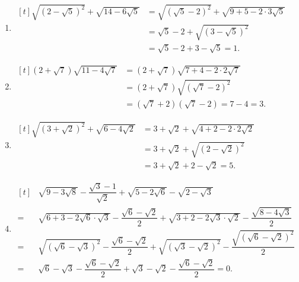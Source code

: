 \begin{bt}
{\begin{enumerate}
			\item $\begin{aligned}[t]
			\sqrt{\left(2-\sqrt{5}\right)^2}+\sqrt{14-6\sqrt{5}} &=\sqrt{\left(\sqrt{5} -2\right)^2} +\sqrt{9+5-2\cdot 3\sqrt{5}} \\
			&=\sqrt{5}-2 +\sqrt{\left(3-\sqrt{5}\right)^2} \\
			&=\sqrt{5}-2 +3-\sqrt{5}=1.
			\end{aligned}$
			\item $\begin{aligned}[t]
			\left(2+\sqrt{7}\right)\sqrt{11-4\sqrt{7}} &=(2+\sqrt{7}) \sqrt{7+4 -2\cdot 2\sqrt{7}} \\
			&=\left(2+\sqrt{7}\right)\sqrt{\left(\sqrt{7}-2\right)^2} \\
			&=\left(\sqrt{7}+2\right)\left(\sqrt{7}-2\right)=7-4=3.
			\end{aligned}$
			\item $\begin{aligned}[t]
			\sqrt{\left(3+\sqrt{2}\right)^2}+\sqrt{6-4\sqrt{2}} &=3+\sqrt{2} +\sqrt{4+2-2\cdot 2\sqrt{2}}\\
			&=3+\sqrt{2}+\sqrt{\left(2-\sqrt{2}\right)^2} \\
			&=3+\sqrt{2}+2-\sqrt{2}=5.
			\end{aligned}$
			\item $\begin{aligned}[t]
			&\sqrt{9-3\sqrt{8}}-\dfrac{\sqrt{3}-1}{\sqrt{2}}+\sqrt{5-2\sqrt{6}}-\sqrt{2-\sqrt{3}}\\
			=&\sqrt{6+3-2\sqrt{6}\cdot \sqrt{3}}-\dfrac{\sqrt{6}-\sqrt{2}}{2}+\sqrt{3+2-2\sqrt{3}\cdot \sqrt{2}}-\dfrac{\sqrt{8-4\sqrt{3}}}{2}\\ =&\sqrt{\left(\sqrt{6}-\sqrt{3}\right)^2}-\dfrac{\sqrt{6}-\sqrt{2}}{2}+\sqrt{\left(\sqrt{3}-\sqrt{2}\right)^2}-\dfrac{\sqrt{\left(\sqrt{6}-\sqrt{2}\right)^2}}{2}\\
			=&\sqrt{6}-\sqrt{3}-\dfrac{\sqrt{6}-\sqrt{2}}{2}+\sqrt{3}-\sqrt{2}-\dfrac{\sqrt{6}-\sqrt{2}}{2}=0.
			\end{aligned}$			
	\end{enumerate}}
\end{bt} 
